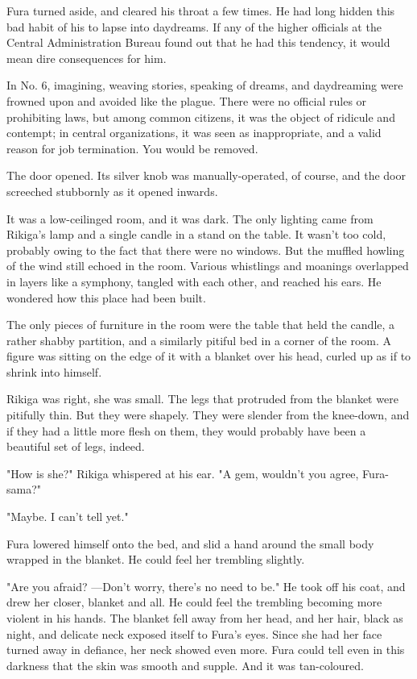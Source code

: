Fura turned aside, and cleared his throat a few times. He had long
hidden this bad habit of his to lapse into daydreams. If any of the
higher officials at the Central Administration Bureau found out that he
had this tendency, it would mean dire consequences for him.

In No. 6, imagining, weaving stories, speaking of dreams, and
daydreaming were frowned upon and avoided like the plague. There were no
official rules or prohibiting laws, but among common citizens, it was
the object of ridicule and contempt; in central organizations, it was
seen as inappropriate, and a valid reason for job termination. You would
be removed.

The door opened. Its silver knob was manually-operated, of course, and
the door screeched stubbornly as it opened inwards.

It was a low-ceilinged room, and it was dark. The only lighting came
from Rikiga's lamp and a single candle in a stand on the table. It
wasn't too cold, probably owing to the fact that there were no windows.
But the muffled howling of the wind still echoed in the room. Various
whistlings and moanings overlapped in layers like a symphony, tangled
with each other, and reached his ears. He wondered how this place had
been built.

The only pieces of furniture in the room were the table that held the
candle, a rather shabby partition, and a similarly pitiful bed in a
corner of the room. A figure was sitting on the edge of it with a
blanket over his head, curled up as if to shrink into himself.

Rikiga was right, she was small. The legs that protruded from the
blanket were pitifully thin. But they were shapely. They were slender
from the knee-down, and if they had a little more flesh on them, they
would probably have been a beautiful set of legs, indeed.

"How is she?" Rikiga whispered at his ear. "A gem, wouldn't you agree,
Fura-sama?"

"Maybe. I can't tell yet."

Fura lowered himself onto the bed, and slid a hand around the small body
wrapped in the blanket. He could feel her trembling slightly.

"Are you afraid? ---Don't worry, there's no need to be." He took off his
coat, and drew her closer, blanket and all. He could feel the trembling
becoming more violent in his hands. The blanket fell away from her head,
and her hair, black as night, and delicate neck exposed itself to Fura's
eyes. Since she had her face turned away in defiance, her neck showed
even more. Fura could tell even in this darkness that the skin was
smooth and supple. And it was tan-coloured.

